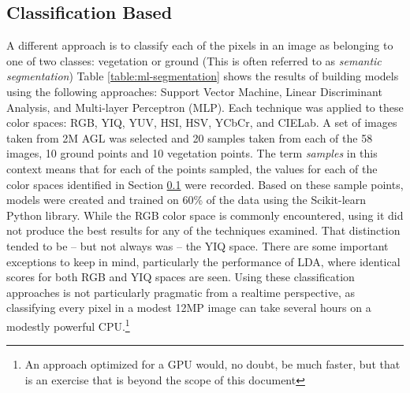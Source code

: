 \documentclass[letterpaper]{article}
\begin{document}
{\subsection{Classification Based}
\label{section:classification}
A different approach is to classify each of the pixels in an image as belonging to one of two classes: vegetation or ground (This is often referred to as \textit{semantic segmentation}) Table \ref{table:ml-segmentation} shows the results of building models using the following approaches:  Support Vector Machine, Linear Discriminant Analysis, and Multi-layer Perceptron (MLP). Each technique was applied to these color spaces: RGB, YIQ, YUV, HSI, HSV, YCbCr, and CIELab. A set of images taken from 2M AGL was selected and 20 samples taken from each of the 58 images, 10 ground points and 10 vegetation points. The term \textit{samples} in this context means that for each of the points sampled, the values for each of the color spaces identified in Section \ref{section:classification} were recorded. Based on these sample points, models were created and trained on 60\% of the data using the Scikit-learn Python library. While the RGB color space is commonly encountered, using it did not produce the best results for any of the techniques examined. That distinction tended to be -- but not always was -- the YIQ space. There are some important exceptions to keep in mind, particularly the performance of LDA, where identical scores for both RGB and YIQ spaces are seen. Using these classification approaches is not particularly pragmatic from a realtime perspective, as classifying every pixel in a modest 12MP image can take several hours on a modestly powerful CPU.\footnote{An approach optimized for a GPU would, no doubt, be much faster, but that is an exercise that is beyond the scope of this document}


}
\end{document}
